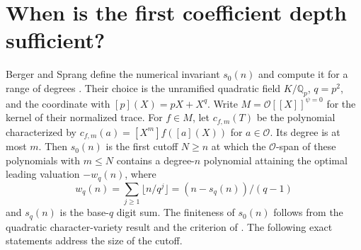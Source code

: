 \section{When is the first coefficient depth sufficient?}
\label{sec:first-depth}
Berger and Sprang define the numerical invariant $s_0(n)$ and compute it for a range of degrees \cite[Definition 5.1 and Section 5]{BS}. Their choice is the unramified quadratic field $K/\mathbb Q_p$, $q=p^2$, and the coordinate with $[p](X)=pX+X^q$. Write $M=\mathcal O[[X]]^{\psi=0}$ for the kernel of their normalized trace. For $f\in M$, let $c_{f,m}(T)$ be the polynomial characterized by $c_{f,m}(a)=[X^m]f([a](X))$ for $a\in\mathcal O$. Its degree is at most $m$. Then $s_0(n)$ is the first cutoff $N\ge n$ at which the $\mathcal O$-span of these polynomials with $m\le N$ contains a degree-$n$ polynomial attaining the optimal leading valuation $-w_q(n)$, where
\[
 w_q(n)=\sum_{j\ge1}\lfloor n/q^j\rfloor=(n-s_q(n))/(q-1)
\]
and $s_q(n)$ is the base-$q$ digit sum. The finiteness of $s_0(n)$ follows from the quadratic character-variety result and the criterion of \cite{BS,BSS}. The following exact statements address the size of the cutoff.

